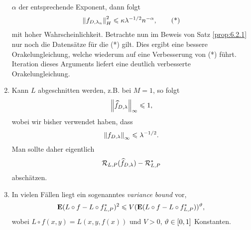 \begin{bem*}[Bemkerungen.]
\begin{bemenum}
\begin{enumerate}[label=\arabic{*}.),leftmargin=2pt]
$\alpha$ der entsprechende Exponent, dann folgt
\begin{align*}
\left\|f_{D,\lambda_n}\right\|_H^2 \leqslant \kappa \lambda^{-1/2}n^{-\alpha},\tag{*}
\end{align*}
mit hoher Wahrscheinlichkeit. Betrachte nun im Beweis von Satz \ref{prop:6.2.1}
nur noch die Datensätze für die (*) gilt. Dies ergibt eine bessere
Orakelungleichung, welche wiederum auf eine Verbesserung von (*) führt.
Iteration dieses Arguments liefert eine deutlich verbesserte Orakelungleichung.
\item Kann $L$ abgeschnitten werden, z.B. bei $M=1$, so folgt
\begin{align*}
\norm{\cut{f}_{D,\lambda}}_\infty \le 1,
\end{align*}
wobei wir bisher verwendet haben, dass
\begin{align*}
\left\|f_{D,\lambda}\right\|_\infty \leqslant \lambda^{-1/2}.
\end{align*}
Man sollte daher eigentlich
\begin{align*}
\RR_{L,P}(\cut{f}_{D,\lambda}) - \RR_{L,P}^*
\end{align*}
abschätzen.
\item In vielen Fällen liegt ein sogenanntes \emph{variance bound} vor,
\begin{align*}
\textbf{E} (L\circ f  - L\circ f_{L,P}^*)^2 \leqslant
V(\textbf{E}(L\circ f - L\circ f_{L,P}^*))^\vartheta,
\end{align*}
wobei $L\circ f(x,y) = L(x,y,f(x))$ und $V>0$, $\vartheta\in [0,1]$ Konstanten.


\end{enumerate}
\end{bemenum}
\end{bem*}

